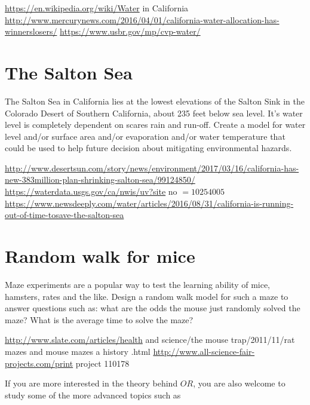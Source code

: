\documentclass[10pt]{article}
\begin{document}
\href{https://en.wikipedia.org/wiki/Water}{https://en.wikipedia.org/wiki/Water} in California \href{http://www.mercurynews.com/2016/04/01/california-water-allocation-has-winnerslosers/}{http://www.mercurynews.com/2016/04/01/california-water-allocation-has-winnerslosers/} \href{https://www.usbr.gov/mp/cvp-water/}{https://www.usbr.gov/mp/cvp-water/}

\section{The Salton Sea}
The Salton Sea in California lies at the lowest elevations of the Salton Sink in the Colorado Desert of Southern California, about 235 feet below sea level. It's water level is completely dependent on scares rain and run-off. Create a model for water level and/or surface area and/or evaporation and/or water temperature that could be used to help future decision about mitigating environmental hazards.

\href{http://www.desertsun.com/story/news/environment/2017/03/16/california-has-new-383million-plan-shrinking-salton-sea/99124850/}{http://www.desertsun.com/story/news/environment/2017/03/16/california-has-new-383million-plan-shrinking-salton-sea/99124850/} \href{https://waterdata.usgs.gov/ca/nwis/uv?site}{https://waterdata.usgs.gov/ca/nwis/uv?site} no $=10254005$ \href{https://www.newsdeeply.com/water/articles/2016/08/31/california-is-running-out-of-time-tosave-the-salton-sea}{https://www.newsdeeply.com/water/articles/2016/08/31/california-is-running-out-of-time-tosave-the-salton-sea}

\section{Random walk for mice}
Maze experiments are a popular way to test the learning ability of mice, hamsters, rates and the like. Design a random walk model for such a maze to answer questions such as: what are the odds the mouse just randomly solved the maze? What is the average time to solve the maze?

\href{http://www.slate.com/articles/health}{http://www.slate.com/articles/health} and science/the mouse trap/2011/11/rat mazes and mouse mazes a history .html \href{http://www.all-science-fair-projects.com/print}{http://www.all-science-fair-projects.com/print} project 110178

If you are more interested in the theory behind $O R$, you are also welcome to study some of the more advanced topics such as
\end{document}
